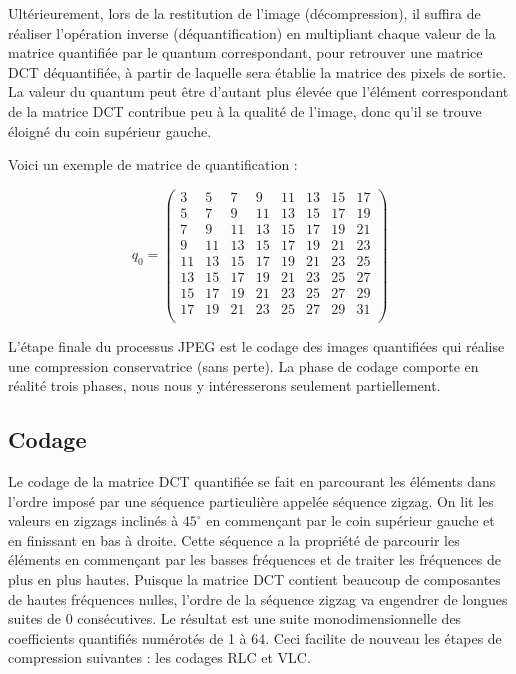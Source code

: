 \documentclass[a4paper,10pt]{article}
\begin{document}
Ultérieurement, lors de la restitution de l'image (décompression), il suffira de réaliser l'opération inverse (déquantification) en multipliant chaque valeur de la matrice quantifiée par le quantum correspondant, pour retrouver une matrice DCT déquantifiée, à partir de laquelle sera établie la matrice des pixels de sortie. La valeur du quantum peut être d'autant plus élevée que l'élément correspondant de la matrice DCT contribue peu à la qualité de l'image, donc qu'il se trouve éloigné du coin supérieur gauche.

Voici un exemple de matrice de quantification :

\begin{equation}
q_0 = \left(
\begin{array}{cccccccc}
3&5&7&9&11&13 & 15 &17 \\
5&7&9&11&13&15&17&19 \\
7&9&11&13&15&17&19&21\\
9&11&13&15&17&19&21&23\\
11&13&15&17&19&21&23&25\\
13&15&17&19&21&23&25&27\\
15&17&19&21&23&25&27&29\\
17&19&21&23&25&27&29&31\\
\end{array}
\right)
\end{equation}

L'étape finale du processus JPEG est le codage des images quantifiées qui réalise une compression conservatrice (sans perte). La phase de codage comporte en réalité trois phases, nous nous y intéresserons seulement partiellement.

\subsection{Codage}

Le codage de la matrice DCT quantifiée se fait en parcourant les éléments dans l'ordre imposé par une séquence particulière appelée séquence zigzag. On lit les valeurs en zigzags inclinés à $45^\circ$ en commençant par le coin supérieur gauche et en finissant en bas à droite. Cette séquence a la propriété de parcourir les éléments en commençant par les basses fréquences et de traiter les fréquences de plus en plus hautes. Puisque la matrice DCT contient beaucoup de composantes de hautes fréquences nulles, l'ordre de la séquence zigzag va engendrer de longues suites de 0 consécutives. Le résultat est une suite monodimensionnelle des coefficients quantifiés numérotés de 1 à 64. Ceci facilite de nouveau les étapes de compression suivantes : les codages RLC et VLC.
\end{document}
